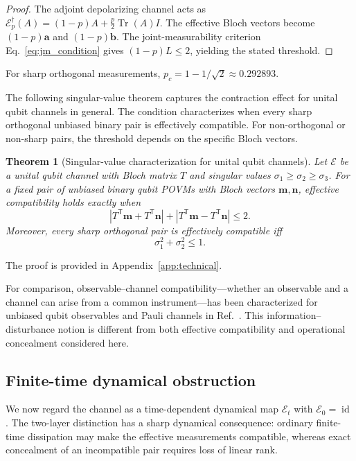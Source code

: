 \documentclass[
aps,pra,twocolumn,10pt,
superscriptaddress,longbibliography,floatfix
]{revtex4-2}
\DeclareMathOperator{\Tr}{Tr}
\DeclareMathOperator{\id}{id}
\newtheorem{theorem}{Theorem}[section]
\begin{document}
\begin{proof}
The adjoint depolarizing channel acts as $\mathcal E_p^\dagger(A) = (1-p)A+\frac{p}{2}\Tr(A)I$. The effective Bloch vectors become $(1-p)\mathbf{a}$ and $(1-p)\mathbf{b}$. The joint-measurability criterion Eq.~\eqref{eq:jm_condition} gives $(1-p)L \le 2$, yielding the stated threshold.
\end{proof}

For sharp orthogonal measurements, $p_c = 1 - 1/\sqrt{2} \approx 0.292893$.

The following singular-value theorem captures the contraction effect for unital qubit channels in general. The condition characterizes when every sharp orthogonal unbiased binary pair is effectively compatible. For non-orthogonal or non-sharp pairs, the threshold depends on the specific Bloch vectors.

\begin{theorem}[Singular-value characterization for unital qubit channels]
\label{thm:singular_value}
Let $\mathcal E$ be a unital qubit channel with Bloch matrix $T$ and singular values $\sigma_1 \ge \sigma_2 \ge \sigma_3$. For a fixed pair of unbiased binary qubit POVMs with Bloch vectors $\mathbf{m},\mathbf{n}$, effective compatibility holds exactly when
\[
|T^{\mathsf T}\mathbf{m} + T^{\mathsf T}\mathbf{n}| + |T^{\mathsf T}\mathbf{m} - T^{\mathsf T}\mathbf{n}| \le 2.
\]
Moreover, every sharp orthogonal pair is effectively compatible iff
\[
\sigma_1^2 + \sigma_2^2 \le 1.
\]
\end{theorem}

The proof is provided in Appendix~\ref{app:technical}.

For comparison, observable--channel compatibility---whether an observable and a channel can arise from a common instrument---has been characterized for unbiased qubit observables and Pauli channels in Ref.~\cite{Heinosaari2018}. This information--disturbance notion is different from both effective compatibility and operational concealment considered here.

\subsection{Finite-time dynamical obstruction}

We now regard the channel as a time-dependent dynamical map $\mathcal E_t$ with $\mathcal E_0=\id$. The two-layer distinction has a sharp dynamical consequence: ordinary finite-time dissipation may make the effective measurements compatible, whereas exact concealment of an incompatible pair requires loss of linear rank.
\end{document}
